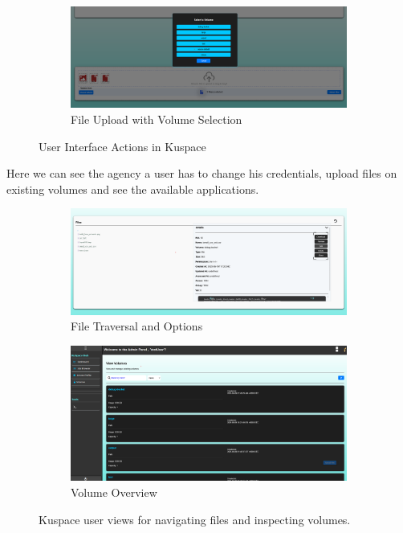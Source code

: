 \begin{figure}[!htbp]
    \begin{subfigure}[b]{0.98\textwidth}
        \includegraphics[width=\textwidth]{Images/kuspace_user_fileUploadVolumeChoice.png}
        \caption{File Upload with Volume Selection}
        \label{fig:fileuploadvolume}
    \end{subfigure}

    \caption{User Interface Actions in Kuspace}
    \label{fig:useractions}
\end{figure}

Here we can see the agency a user has to change his credentials, upload files on existing volumes 
and see the available applications. 

\newpage
\begin{figure}[!htbp]
    \centering
    \begin{subfigure}[b]{0.48\textwidth}
        \includegraphics[width=\textwidth]{Images/kuspace_user_fileTraversanlOptions.png}
        \caption{File Traversal and Options}
        \label{fig:filetraversal}
    \end{subfigure}
    \hfill
    \begin{subfigure}[b]{0.48\textwidth}
        \includegraphics[width=\textwidth]{Images/kuspace_VolumeView.png}
        \caption{Volume Overview}
        \label{fig:volumeview}
    \end{subfigure}
    \caption{Kuspace user views for navigating files and inspecting volumes.}
    \label{fig:user-file-volume}
\end{figure}

